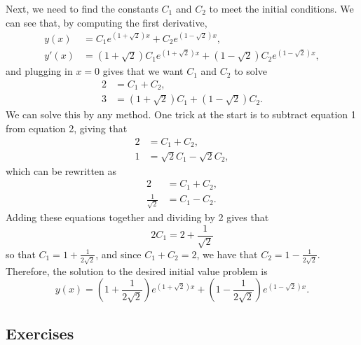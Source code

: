 \begin{exampleSol}
Next, we need to find the constants $C_1$ and $C_2$ to meet the initial conditions. We can see that, by computing the first derivative,
\begin{equation*}
\begin{split}
y(x) &= C_1e^{(1+\sqrt{2})x} + C_2e^{(1 - \sqrt{2})x}, \\
y'(x) &= (1+\sqrt{2})C_1e^{(1+\sqrt{2})x} + (1 - \sqrt{2})C_2e^{(1 - \sqrt{2})x},
\end{split}
\end{equation*}
and plugging in $x=0$ gives that we want $C_1$ and $C_2$ to solve
\begin{equation*}
\begin{split}
2 &= C_1 + C_2, \\
3 &= (1 + \sqrt{2})C_1 + (1 - \sqrt{2})C_2.
\end{split}
\end{equation*}
We can solve this by any method. One trick at the start is to subtract equation 1 from equation 2, giving that
\begin{equation*}
\begin{split}
2 &= C_1 + C_2, \\
1 &= \sqrt{2}C_1 - \sqrt{2}C_2,
\end{split}
\end{equation*}
which can be rewritten as
\begin{equation*}
\begin{split}
2 &= C_1 + C_2, \\
\frac{1}{\sqrt{2}} &= C_1 - C_2.
\end{split}
\end{equation*}
Adding these equations together and dividing by 2 gives that
\begin{equation*}
2C_1 = 2 + \frac{1}{\sqrt{2}}
\end{equation*}
so that $C_1 = 1 + \frac{1}{2\sqrt{2}}$, and since $C_1 + C_2 = 2$, we have that $C_2 = 1 - \frac{1}{2\sqrt{2}}$. Therefore, the solution to the desired initial value problem is
\begin{equation*}
y(x) = \left(1 + \frac{1}{2\sqrt{2}}\right)e^{(1 + \sqrt{2})x} + \left(1 - \frac{1}{2\sqrt{2}}\right)e^{(1 - \sqrt{2})x}.
\end{equation*}
\end{exampleSol}

\subsection{Exercises}

